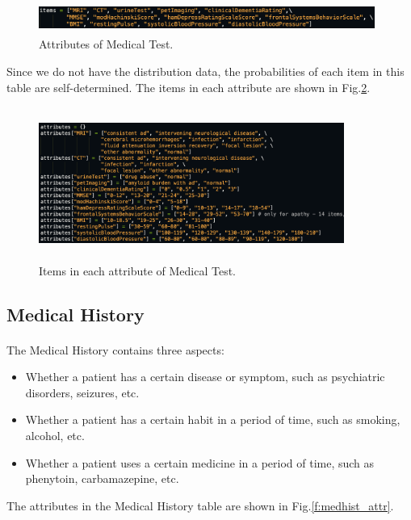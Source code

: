 \documentclass{article}
\begin{document}
\begin{figure}[!hbt]
\centering
\includegraphics[width=11cm, height=1cm]{figs/medtest_attr.png}
\caption{Attributes of Medical Test.}
\label{f:medtest_attr}
\end{figure}

\noindent Since we do not have the distribution data, the probabilities of each item in this table are self-determined. The items in each attribute are shown in Fig.\ref{f:medtest}.

\begin{figure}[!hbt]
\centering
\includegraphics[width=10cm, height=5cm]{figs/medtest.png}
\caption{Items in each attribute of Medical Test.}
\label{f:medtest}
\end{figure}




\subsection{Medical History}
\paragraph{}
The Medical History contains three aspects:

\begin{itemize}
  \item Whether a patient has a certain disease or symptom, such as psychiatric disorders, seizures, etc.
  \item Whether a patient has a certain habit in a period of time, such as smoking, alcohol, etc.
  \item Whether a patient uses a certain medicine in a period of time, such as phenytoin, carbamazepine, etc.
\end{itemize}
\vspace{2mm}
\noindent The attributes in the Medical History table are shown in Fig.\ref{f:medhist_attr}.
\end{document}
